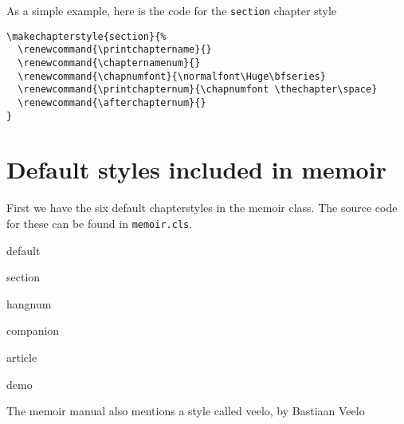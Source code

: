 As a simple example, here is the code for the \texttt{section} chapter
style
\begin{Verbatim}[label={Source code for the \textsf{section} chapter style}]
\makechapterstyle{section}{%
  \renewcommand{\printchaptername}{}
  \renewcommand{\chapternamenum}{}
  \renewcommand{\chapnumfont}{\normalfont\Huge\bfseries}
  \renewcommand{\printchapternum}{\chapnumfont \thechapter\space}
  \renewcommand{\afterchapternum}{}
}
\end{Verbatim}



\clearpage

\chapter{Default styles included in memoir}
\label{cha:defa-styl-incl}

First we have the six default chapterstyles in the memoir class. The
source code for these can be found in \texttt{memoir.cls}.

\begin{showchapterstyle}{default}
\end{showchapterstyle}

\begin{showchapterstyle}{section}
\end{showchapterstyle}

\begin{showchapterstyle}{hangnum}
\end{showchapterstyle}

\begin{showchapterstyle}{companion}
\end{showchapterstyle}

\begin{showchapterstyle}{article}
\end{showchapterstyle}

\begin{showchapterstyle}{demo}
\end{showchapterstyle}

\bigskip

\starbreak

\bigskip

\noindent 
The memoir manual also mentions a style called \textsf{veelo}, by
Bastiaan Veelo


